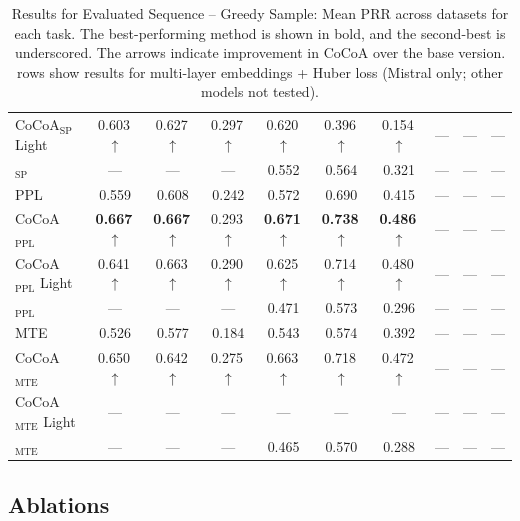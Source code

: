 \begin{table}[htbp]
{\begin{tabular}{l ccc ccc ccc}
CoCoA$_{\mathrm{SP}}$ Light & 0.603\,$\uparrow$ & 0.627\,$\uparrow$ & 0.297\,$\uparrow$ & 0.620\,$\uparrow$ & 0.396\,$\uparrow$ & 0.154\,$\uparrow$ & --- & --- & --- \\
\method{}$_{\mathrm{SP}}$ & --- & --- & --- & 0.552 & 0.564 & 0.321 & --- & --- & --- \\
\midrule
PPL & 0.559 & 0.608 & 0.242 & 0.572 & 0.690 & 0.415 & --- & --- & --- \\
CoCoA$_{\mathrm{PPL}}$ & \textbf{0.667}\,$\uparrow$ & \textbf{0.667}\,$\uparrow$ & 0.293\,$\uparrow$ & \textbf{0.671}\,$\uparrow$ & \textbf{0.738}\,$\uparrow$ & \textbf{0.486}\,$\uparrow$ & --- & --- & --- \\
CoCoA$_{\mathrm{PPL}}$ Light & 0.641\,$\uparrow$ & 0.663\,$\uparrow$ & 0.290\,$\uparrow$ & 0.625\,$\uparrow$ & 0.714\,$\uparrow$ & 0.480\,$\uparrow$ & --- & --- & --- \\
\method{}$_{\mathrm{PPL}}$ & --- & --- & --- & 0.471 & 0.573 & 0.296 & --- & --- & --- \\
\midrule
MTE & 0.526 & 0.577 & 0.184 & 0.543 & 0.574 & 0.392 & --- & --- & --- \\
CoCoA$_{\mathrm{MTE}}$ & 0.650\,$\uparrow$ & 0.642\,$\uparrow$ & 0.275\,$\uparrow$ & 0.663\,$\uparrow$ & 0.718\,$\uparrow$ & 0.472\,$\uparrow$ & --- & --- & --- \\
CoCoA$_{\mathrm{MTE}}$ Light & --- & --- & --- & --- & --- & --- & --- & --- & --- \\
\method{}$_{\mathrm{MTE}}$ & --- & --- & --- & 0.465 & 0.570 & 0.288 & --- & --- & --- \\
\bottomrule
\end{tabular}%
}
\caption{Results for Evaluated Sequence -- Greedy Sample: Mean PRR across datasets for each task. The best-performing method is shown in bold, and the second-best is underscored. The arrows indicate improvement in CoCoA over the base version. \method{} rows show results for multi-layer embeddings + Huber loss (Mistral only; other models not tested).}
\label{tab:cocoa_table1}
\end{table}

\subsection{Ablations}
\label{sec:ablations}

